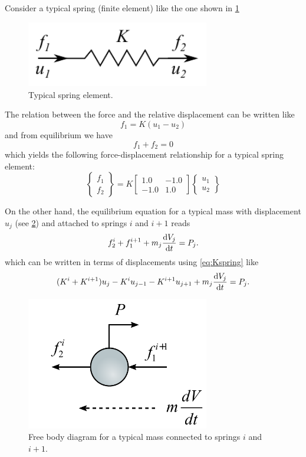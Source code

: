 Consider a typical spring (finite element) like the one shown in \cref{fig:springel}
\begin{figure}[H]
\centering
\includegraphics[width=8cm]{springel.pdf}
\caption{Typical spring element.}
\label{fig:springel}
\end{figure}

The relation between the force and the relative displacement can be written like
\[f_1 = K(u_1 - u_2)\]
and from equilibrium we have
\[f_1 + f_2 = 0\]
which yields the following force-displacement relationship for a typical spring element:
\begin{equation}
    \begin{Bmatrix}
        f_1\\
        f_2
    \end{Bmatrix} =
    K\begin{bmatrix}
          1.0 & -1.0\\
        - 1.0 & 1.0
    \end{bmatrix}
    \begin{Bmatrix}
        u_1\\
        u_2
    \end{Bmatrix}
    \label{eq:Kspring}
\end{equation}

On the other hand, the equilibrium equation for a typical mass with displacement $u_j$  (see \cref{fig:dclmass}) and attached to springs $i$ and $i+1$ reads
\begin{equation}
f_2^i + f_1^{i + 1} + m_j \dv{V_j}{t} = P_j.
\label{eq:equilmass}
\end{equation}
which can be written in terms of displacements using \cref{eq:Kspring} like
\[(K^i + K^{i + 1}) u_j - K^i u_{j - 1} - K^{i + 1} u_{j + 1} + m_j\dv{V_j}{t} = P_j .\]


\begin{figure}[H]
\centering
\includegraphics[width=8cm]{dcl_mass.pdf}
\caption{Free body diagram for a typical mass connected to springs $i$ and $i+1$.}
\label{fig:dclmass}
\end{figure}


